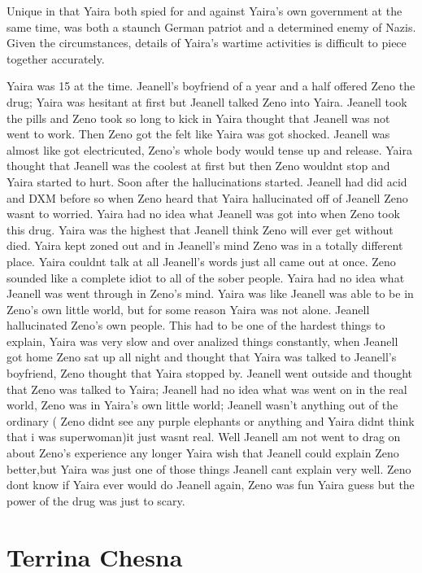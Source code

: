 \documentclass[12pt]{book}
\begin{document}
Unique in that Yaira both spied for and against Yaira's own government at the same time, was both a staunch German patriot and a determined enemy of Nazis. Given the circumstances, details of Yaira's wartime activities is difficult to piece together accurately.



Yaira was 15 at the time. Jeanell's boyfriend of a year and a half offered Zeno the drug; Yaira was hesitant at first but Jeanell talked Zeno into Yaira. Jeanell took the pills and Zeno took so long to kick in Yaira thought that Jeanell was not went to work. Then Zeno got the felt like Yaira was got shocked. Jeanell was almost like got electricuted, Zeno's whole body would tense up and release. Yaira thought that Jeanell was the coolest at first but then Zeno wouldnt stop and Yaira started to hurt. Soon after the hallucinations started. Jeanell had did acid and DXM before so when Zeno heard that Yaira hallucinated off of Jeanell Zeno wasnt to worried. Yaira had no idea what Jeanell was got into when Zeno took this drug. Yaira was the highest that Jeanell think Zeno will ever get without died. Yaira kept zoned out and in Jeanell's mind Zeno was in a totally different place. Yaira couldnt talk at all Jeanell's words just all came out at once. Zeno sounded like a complete idiot to all of the sober people. Yaira had no idea what Jeanell was went through in Zeno's mind. Yaira was like Jeanell was able to be in Zeno's own little world, but for some reason Yaira was not alone. Jeanell hallucinated Zeno's own people. This had to be one of the hardest things to explain, Yaira was very slow and over analized things constantly, when Jeanell got home Zeno sat up all night and thought that Yaira was talked to Jeanell's boyfriend, Zeno thought that Yaira stopped by. Jeanell went outside and thought that Zeno was talked to Yaira; Jeanell had no idea what was went on in the real world, Zeno was in Yaira's own little world; Jeanell wasn't anything out of the ordinary ( Zeno didnt see any purple elephants or anything and Yaira didnt think that i was superwoman)it just wasnt real. Well Jeanell am not went to drag on about Zeno's experience any longer Yaira wish that Jeanell could explain Zeno better,but Yaira was just one of those things Jeanell cant explain very well. Zeno dont know if Yaira ever would do Jeanell again, Zeno was fun Yaira guess but the power of the drug was just to scary.



\chapter{Terrina Chesna}
\end{document}
